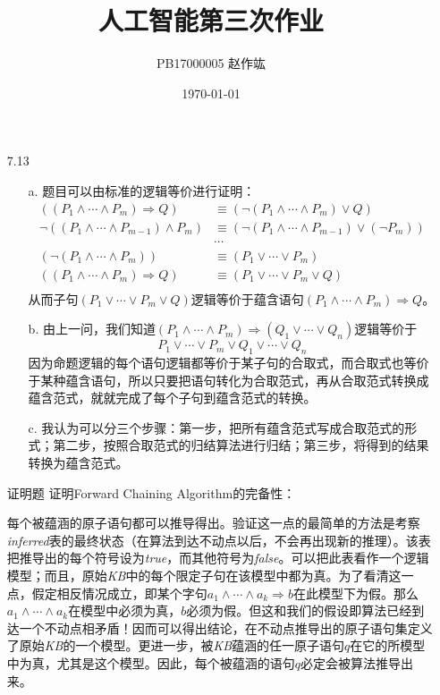 \documentclass[UTF8,zihao=-4]{ctexart}
\title{\heiti 人工智能\quad 第三次作业}
\author{PB17000005\quad \CJKfontspec{AR PL UKai CN} 赵作竑}
\date{\kaishu \today}
\begin{document}
	\maketitle
	\begin{enumerate}
		\item[7.13]
		\begin{enumerate}
			\item[a.]题目可以由标准的逻辑等价进行证明：
			\begin{align*}
				((P_1\wedge \cdots \wedge P_m) \Rightarrow Q) &\equiv (\neg (P_1\wedge \cdots \wedge P_m) \vee Q) \\
				\neg ((P_1\wedge \cdots \wedge P_{m-1}) \wedge P_m) &\equiv (\neg (P_1\wedge \cdots \wedge P_{m-1})\vee(\neg P_m)) \\
				&\cdots \\
				(\neg (P_1\wedge \cdots \wedge P_m)) &\equiv (P_1 \vee \cdots \vee P_m) \\
				((P_1\wedge \cdots \wedge P_m) \Rightarrow Q) &\equiv (P_1 \vee \cdots \vee P_m \vee Q) \\
			\end{align*}
			从而子句$(P_1 \vee \cdots \vee P_m \vee Q)$逻辑等价于蕴含语句$(P_1\wedge \cdots \wedge P_m) \Rightarrow Q$。
			\item[b.]由上一问，我们知道$(P_1\wedge \cdots \wedge P_m)\Rightarrow (Q_1\vee \cdots \vee Q_n)$逻辑等价于
			\begin{equation*}
				P_1\vee \cdots \vee P_m \vee Q_1 \vee \cdots \vee Q_n
			\end{equation*}
			因为命题逻辑的每个语句逻辑都等价于某子句的合取式，而合取式也等价于某种蕴含语句，所以只要把语句转化为合取范式，再从合取范式转换成蕴含范式，就就完成了每个子句到蕴含范式的转换。
			\item[c.]我认为可以分三个步骤：第一步，把所有蕴含范式写成合取范式的形式；第二步，按照合取范式的归结算法进行归结；第三步，将得到的结果转换为蕴含范式。
		\end{enumerate}
		\pagebreak
		\item[证明题]证明Forward Chaining Algorithm的完备性：
		
		每个被蕴涵的原子语句都可以推导得出。验证这一点的最简单的方法是考察\textit{inferred}表的最终状态（在算法到达\textsf{不动点}以后，不会再出现新的推理）。该表把推导出的每个符号设为\textit{true}，而其他符号为\textit{false}。可以把此表看作一个逻辑模型；而且，原始\textit{KB}中的每个限定子句在该模型中都为真。为了看清这一点，假定相反情况成立，即某个字句$a_1\wedge \cdots \wedge a_k \Rightarrow b$在此模型下为假。那么$a_1\wedge \cdots \wedge a_k$在模型中必须为真，$b$必须为假。但这和我们的假设即算法已经到达一个不动点相矛盾！因而可以得出结论，在不动点推导出的原子语句集定义了原始\textit{KB}的一个模型。更进一步，被\textit{KB}蕴涵的任一原子语句$q$在它的所模型中为真，尤其是这个模型。因此，每个被蕴涵的语句$q$必定会被算法推导出来。
	\end{enumerate}
\end{document}
